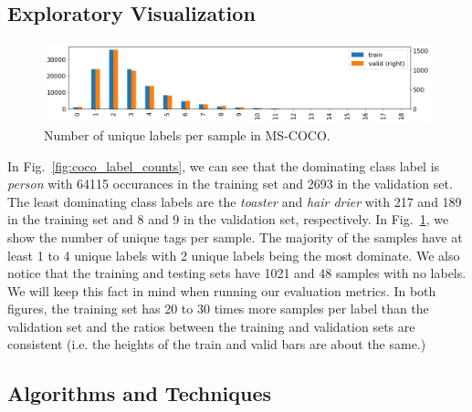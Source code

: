 \documentclass[12pt,journal,compsoc]{IEEEtran}
\begin{document}
\subsection{Exploratory Visualization}


\begin{figure}[!t]
\normalsize
\includegraphics[width=\linewidth]{mscoco_n_images_with_k_tags.png}
\caption{Number of unique labels per sample in MS-COCO.}
\label{fig:coco_n_images_with_k_tags}
\vspace*{4pt}
\end{figure}

In Fig.~\ref{fig:coco_label_counts}, we can see that the dominating class label is \textit{person} with 64115 occurances in the training set and 2693 in the validation set. The least dominating class labels are the \textit{toaster} and \textit{hair drier} with 217 and 189 in the training set and 8 and 9 in the validation set, respectively.
In Fig.~\ref{fig:coco_n_images_with_k_tags}, we show the number of unique tags per sample. The majority of the samples have at least 1 to 4 unique labels with 2 unique labels being the most dominate. We also notice that the training and testing sets have 1021 and 48 samples with no labels. We will keep this fact in mind when running our evaluation metrics.
In both figures, the training set has 20 to 30 times more samples per label than the validation set and the ratios between the training and validation sets are consistent (i.e. the heights of the train and valid bars are about the same.)

\subsection{Algorithms and Techniques}\label{sec:algo}
\end{document}
